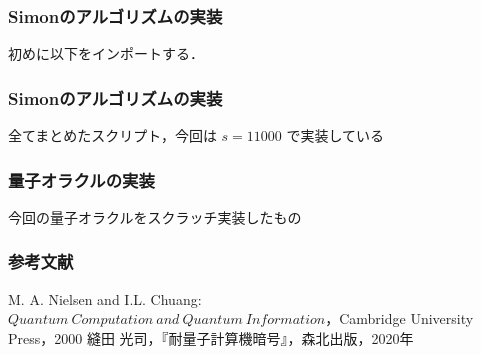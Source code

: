 \documentclass[dvipdfmx,12pt]{beamer}%
\begin{document}
\begin{frame}

\frametitle{Simonのアルゴリズムの実装}
              
初めに以下をインポートする．

\vspace{10pt}



                  
\end{frame}


\begin{frame}

\frametitle{Simonのアルゴリズムの実装}
              
全てまとめたスクリプト，今回は $ s = 11000 $ で実装している

\vspace{10pt}



                  
\end{frame}


\begin{frame}

\frametitle{量子オラクルの実装}
              
今回の量子オラクルをスクラッチ実装したもの

\vspace{10pt}



                  
\end{frame}


\begin{frame}

\frametitle{参考文献}

\begin{thebibliography}{9}
  \beamertemplatetextbibitems
  M. A. Nielsen and I.L. Chuang: $Quantum \ Computation \ and \ Quantum \ Information$，Cambridge University Press，2000
  縫田 光司，『耐量子計算機暗号』，森北出版，2020年
\end{thebibliography}

\end{frame}
\end{document}
